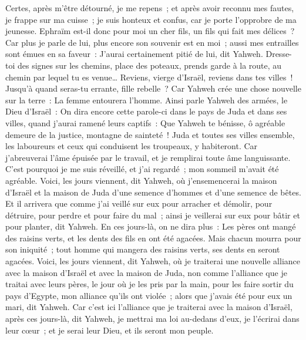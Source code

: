 \begin{multicols}{2}
Certes, après m'être détourné, je me repens~; et après avoir reconnu mes fautes, je frappe sur ma cuisse~; je suis honteux et confus, car je porte l'opprobre de ma jeunesse.
Ephraïm est-il donc pour moi un cher fils, un fils qui fait mes délices~? Car plus je parle de lui, plus encore son souvenir est en moi~; aussi mes entrailles sont émues en sa faveur~: J'aurai certainement pitié de lui, dit Yahweh.
Dresse-toi des signes sur les chemins, place des poteaux, prends garde à la route, au chemin par lequel tu es venue… Reviens, vierge d'Israël, reviens dans tes villes~!
Jusqu'à quand seras-tu errante, fille rebelle~? Car Yahweh crée une chose nouvelle sur la terre~: La femme entourera l'homme.
Ainsi parle Yahweh des armées, le Dieu d'Israël~: On dira encore cette parole-ci dans le pays de Juda et dans ses villes, quand j'aurai ramené leurs captifs~: Que Yahweh te bénisse, ô agréable demeure de la justice, montagne de sainteté~!
Juda et toutes ses villes ensemble, les laboureurs et ceux qui conduisent les troupeaux, y habiteront.
Car j'abreuverai l'âme épuisée par le travail, et je remplirai toute âme languissante.
C'est pourquoi je me suis réveillé, et j'ai regardé~; mon sommeil m'avait été agréable.
Voici, les jours viennent, dit Yahweh, où j'ensemencerai la maison d'Israël et la maison de Juda d'une semence d'hommes et d'une semence de bêtes.
Et il arrivera que comme j'ai veillé sur eux pour arracher et démolir, pour détruire, pour perdre et pour faire du mal~; ainsi je veillerai sur eux pour bâtir et pour planter, dit Yahweh.
En ces jours-là, on ne dira plus~: Les pères ont mangé des raisins verts, et les dents des fils en ont été agacées.
Mais chacun mourra pour son iniquité~; tout homme qui mangera des raisins verts, ses dents en seront agacées.
Voici, les jours viennent, dit Yahweh, où je traiterai une nouvelle alliance avec la maison d'Israël et avec la maison de Juda,
non comme l'alliance que je traitai avec leurs pères, le jour où je les pris par la main, pour les faire sortir du pays d'Egypte, mon alliance qu'ils ont violée~; alors que j'avais été pour eux un mari, dit Yahweh.
Car c'est ici l'alliance que je traiterai avec la maison d'Israël, après ces jours-là, dit Yahweh, je mettrai ma loi au-dedans d'eux, je l'écrirai dans leur cœur~; et je serai leur Dieu, et ils seront mon peuple.

\end{multicols}
